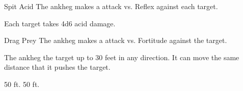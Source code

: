   \begin{freeability}{Spit Acid}
       The ankheg makes a  attack
        vs. Reflex against each target.
    
    \hit Each target takes 4d6 acid damage.
    \end{freeability}
  

    \begin{freeability}{Drag Prey}
       The ankheg makes a  attack
        vs. Fortitude against the target.
    
    \hit The ankheg  the target up to 30 feet in any direction.
          It can move the same distance that it pushes the target.
    \end{freeability}
  
      
       50 ft.
     50 ft.
  

